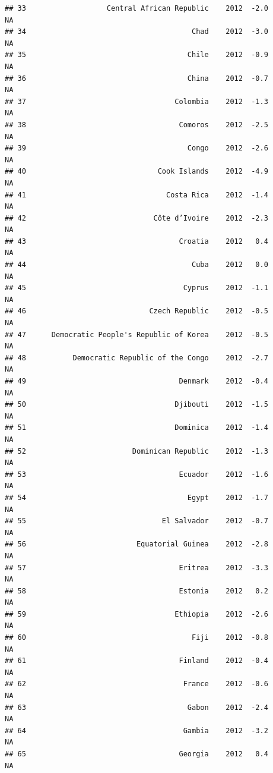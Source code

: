 \documentclass[
]{book}
\begin{document}
\begin{verbatim}
## 33                   Central African Republic    2012  -2.0              NA
## 34                                       Chad    2012  -3.0              NA
## 35                                      Chile    2012  -0.9              NA
## 36                                      China    2012  -0.7              NA
## 37                                   Colombia    2012  -1.3              NA
## 38                                    Comoros    2012  -2.5              NA
## 39                                      Congo    2012  -2.6              NA
## 40                               Cook Islands    2012  -4.9              NA
## 41                                 Costa Rica    2012  -1.4              NA
## 42                              Côte d’Ivoire    2012  -2.3              NA
## 43                                    Croatia    2012   0.4              NA
## 44                                       Cuba    2012   0.0              NA
## 45                                     Cyprus    2012  -1.1              NA
## 46                             Czech Republic    2012  -0.5              NA
## 47      Democratic People's Republic of Korea    2012  -0.5              NA
## 48           Democratic Republic of the Congo    2012  -2.7              NA
## 49                                    Denmark    2012  -0.4              NA
## 50                                   Djibouti    2012  -1.5              NA
## 51                                   Dominica    2012  -1.4              NA
## 52                         Dominican Republic    2012  -1.3              NA
## 53                                    Ecuador    2012  -1.6              NA
## 54                                      Egypt    2012  -1.7              NA
## 55                                El Salvador    2012  -0.7              NA
## 56                          Equatorial Guinea    2012  -2.8              NA
## 57                                    Eritrea    2012  -3.3              NA
## 58                                    Estonia    2012   0.2              NA
## 59                                   Ethiopia    2012  -2.6              NA
## 60                                       Fiji    2012  -0.8              NA
## 61                                    Finland    2012  -0.4              NA
## 62                                     France    2012  -0.6              NA
## 63                                      Gabon    2012  -2.4              NA
## 64                                     Gambia    2012  -3.2              NA
## 65                                    Georgia    2012   0.4              NA

\end{verbatim}
\end{document}
